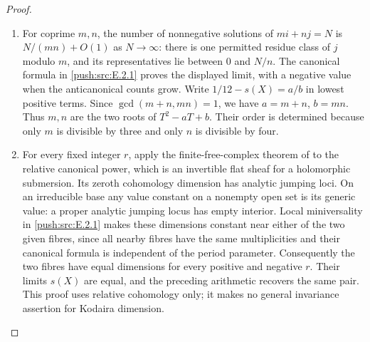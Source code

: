 \begin{proof}
\begin{enumerate}[label=\arabic*.,leftmargin=*]
\item For coprime $m,n$, the number of nonnegative solutions of
$mi+nj=N$ is $N/(mn)+O(1)$ as $N\to\infty$:
there is one permitted residue class of $j$ modulo $m$, and
its representatives lie between $0$ and $N/n$.
The canonical formula in \ref{push:src:E.2.1} proves the displayed limit,
with a negative value when the anticanonical counts grow.
Write $1/12-s(X)=a/b$ in lowest positive terms.
Since $\gcd(m+n,mn)=1$, we have $a=m+n$, $b=mn$.
Thus $m,n$ are the two roots of $T^2-aT+b$.
Their order is determined because only $m$ is divisible by
three and only $n$ is divisible by four.

\item For every fixed integer $r$, apply the finite-free-complex
theorem of \cite[Chapter III, Theorem 4.1]{BS76} to
the relative canonical power, which is an invertible flat
sheaf for a holomorphic submersion.  Its zeroth cohomology
dimension has analytic jumping loci.  On an irreducible
base any value constant on a nonempty open set is its
generic value: a proper analytic jumping locus has empty
interior.  Local miniversality in \ref{push:src:E.2.1} makes these dimensions
constant near either of the two given fibres, since all
nearby fibres have the same multiplicities and their
canonical formula is independent of the period parameter.
Consequently the two fibres have equal dimensions for
every positive and negative $r$.  Their limits $s(X)$
are equal, and the preceding arithmetic recovers the same
pair.  This proof uses relative cohomology only; it makes
no general invariance assertion for Kodaira dimension.
\end{enumerate}
\end{proof}


